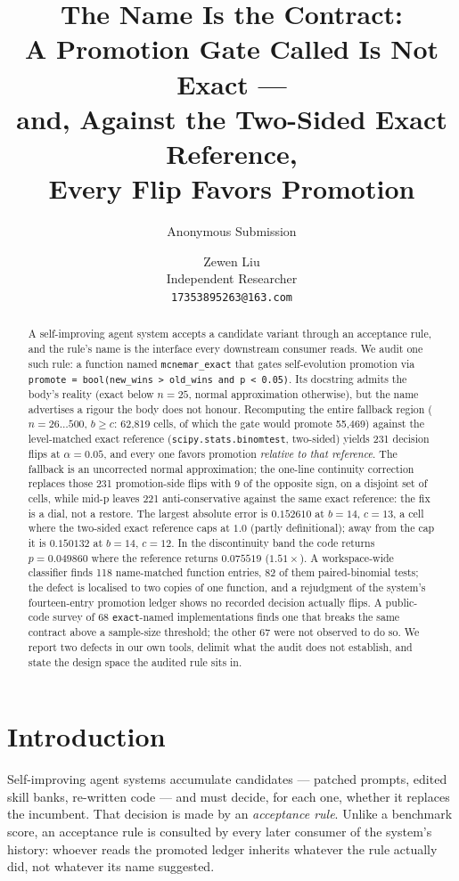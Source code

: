 \documentclass[10pt]{article}
\title{The Name Is the Contract:\\
A Promotion Gate Called \code{mcnemar\_exact} Is Not Exact ---\\
and, Against the Two-Sided Exact Reference,\\
Every Flip Favors Promotion}
\author{\name Anonymous Submission}
\author{\name Zewen Liu \\ Independent Researcher \\ \texttt{17353895263@163.com}}
\newcommand{\code}[1]{\texttt{#1}}
\begin{document}
\maketitle

\begin{abstract}
A self-improving agent system accepts a candidate variant through an acceptance
rule, and the rule's name is the interface every downstream consumer reads. We
audit one such rule: a function named \code{mcnemar\_exact} that gates
self-evolution promotion via
\code{promote = bool(new\_wins > old\_wins and p < 0.05)}. Its docstring admits
the body's reality (exact below $n{=}25$, normal approximation otherwise), but
the name advertises a rigour the body does not honour. Recomputing the entire
fallback region ($n{=}26\ldots500$, $b\ge c$: 62{,}819 cells, of which the gate
would promote 55{,}469) against the level-matched exact reference
(\code{scipy.stats.binomtest}, two-sided) yields 231 decision flips at
$\alpha{=}0.05$, and every one favors promotion \emph{relative to that
reference}. The fallback is an uncorrected normal approximation; the one-line
continuity correction replaces those 231 promotion-side flips with 9 of the
opposite sign, on a disjoint set of cells, while mid-p leaves 221
anti-conservative against the same exact reference: the fix is a dial, not a
restore. The largest absolute error is $0.152610$ at $b{=}14$, $c{=}13$, a cell
where the two-sided exact reference caps at $1.0$ (partly definitional); away
from the cap it is $0.150132$ at $b{=}14$, $c{=}12$. In the discontinuity band
the code returns $p=0.049860$ where the reference returns $0.075519$
($1.51\times$). A workspace-wide classifier finds 118 name-matched function
entries, 82 of them paired-binomial tests; the defect is localised to two copies
of one function, and a rejudgment of the system's fourteen-entry promotion
ledger shows no recorded decision actually flips. A public-code survey of 68
\code{exact}-named implementations finds one that breaks the same contract above
a sample-size threshold; the other 67 were not observed to do so. We report two
defects in our own tools, delimit what the audit does not establish, and state
the design space the audited rule sits in.
\end{abstract}

\section{Introduction}

Self-improving agent systems accumulate candidates --- patched prompts, edited
skill banks, re-written code --- and must decide, for each one, whether it
replaces the incumbent. That decision is made by an \emph{acceptance rule}.
Unlike a benchmark score, an acceptance rule is consulted by every later
consumer of the system's history: whoever reads the promoted ledger inherits
whatever the rule actually did, not whatever its name suggested.
\end{document}
